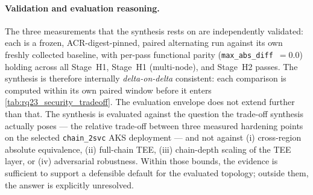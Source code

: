 \paragraph{Validation and evaluation reasoning.}
The three measurements that the synthesis rests on are independently
validated: each is a frozen, ACR-digest-pinned, paired alternating run
against its own freshly collected baseline, with per-pass functional
parity (\texttt{max\_abs\_diff}~$=0.0$) holding across all Stage~H1, Stage~H1 (multi-node),
and Stage~H2 passes. The synthesis is therefore internally
\emph{delta-on-delta} consistent: each comparison is computed within its
own paired window before it enters \cref{tab:rq23_security_tradeoff}.
The evaluation envelope does not extend further than that. The
synthesis is evaluated against the question the trade-off synthesis actually poses --- the
relative trade-off between three measured hardening points on the
selected \texttt{chain\_2svc} AKS deployment --- and not against (i)
cross-region absolute equivalence, (ii) full-chain TEE, (iii) chain-depth
scaling of the TEE layer, or (iv) adversarial robustness. Within those
bounds, the evidence is sufficient to support a defensible default for
the evaluated topology; outside them, the answer is explicitly
unresolved.

